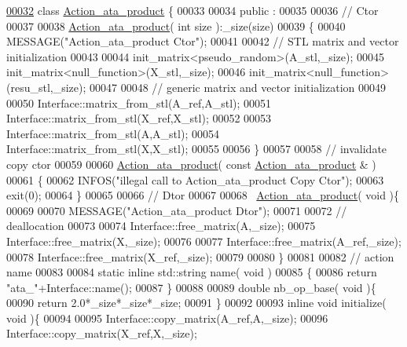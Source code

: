 \begin{DoxyCode}
\hyperlink{class_action__ata__product}{00032} \textcolor{keyword}{class }\hyperlink{class_action__ata__product}{Action\_ata\_product} \{
00033 
00034 public :
00035 
00036   \textcolor{comment}{// Ctor}
00037 
00038   \hyperlink{class_action__ata__product}{Action\_ata\_product}( \textcolor{keywordtype}{int} size ):\_size(size)
00039   \{
00040     MESSAGE(\textcolor{stringliteral}{"Action\_ata\_product Ctor"});
00041 
00042     \textcolor{comment}{// STL matrix and vector initialization}
00043 
00044     init\_matrix<pseudo\_random>(A\_stl,\_size);
00045     init\_matrix<null\_function>(X\_stl,\_size);
00046     init\_matrix<null\_function>(resu\_stl,\_size);
00047 
00048     \textcolor{comment}{// generic matrix and vector initialization}
00049 
00050     Interface::matrix\_from\_stl(A\_ref,A\_stl);
00051     Interface::matrix\_from\_stl(X\_ref,X\_stl);
00052 
00053     Interface::matrix\_from\_stl(A,A\_stl);
00054     Interface::matrix\_from\_stl(X,X\_stl);
00055 
00056   \}
00057 
00058   \textcolor{comment}{// invalidate copy ctor}
00059 
00060   \hyperlink{class_action__ata__product}{Action\_ata\_product}( \textcolor{keyword}{const}  \hyperlink{class_action__ata__product}{Action\_ata\_product} & )
00061   \{
00062     INFOS(\textcolor{stringliteral}{"illegal call to Action\_ata\_product Copy Ctor"});
00063     exit(0);
00064   \}
00065 
00066   \textcolor{comment}{// Dtor}
00067 
00068   ~\hyperlink{class_action__ata__product}{Action\_ata\_product}( \textcolor{keywordtype}{void} )\{
00069 
00070     MESSAGE(\textcolor{stringliteral}{"Action\_ata\_product Dtor"});
00071 
00072     \textcolor{comment}{// deallocation}
00073 
00074     Interface::free\_matrix(A,\_size);
00075     Interface::free\_matrix(X,\_size);
00076 
00077     Interface::free\_matrix(A\_ref,\_size);
00078     Interface::free\_matrix(X\_ref,\_size);
00079 
00080   \}
00081 
00082   \textcolor{comment}{// action name}
00083 
00084   \textcolor{keyword}{static} \textcolor{keyword}{inline} std::string name( \textcolor{keywordtype}{void} )
00085   \{
00086     \textcolor{keywordflow}{return} \textcolor{stringliteral}{"ata\_"}+Interface::name();
00087   \}
00088 
00089   \textcolor{keywordtype}{double} nb\_op\_base( \textcolor{keywordtype}{void} )\{
00090     \textcolor{keywordflow}{return} 2.0*\_size*\_size*\_size;
00091   \}
00092 
00093   \textcolor{keyword}{inline} \textcolor{keywordtype}{void} initialize( \textcolor{keywordtype}{void} )\{
00094 
00095     Interface::copy\_matrix(A\_ref,A,\_size);
00096     Interface::copy\_matrix(X\_ref,X,\_size);

\end{DoxyCode}
